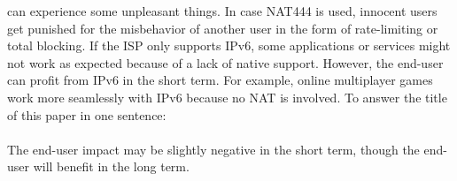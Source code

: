 \documentclass[format=sigconf, natbib=true, nonacm=true]{acmart}
\begin{document}
can experience some unpleasant things. In case NAT444 is used, innocent users get punished for the misbehavior of another user in the form of rate-limiting or total blocking. If the ISP only supports IPv6, some applications or services might not work as expected because of a lack of native support. However, the end-user can profit from IPv6 in the short term. For example, online multiplayer games work more seamlessly with IPv6 because no NAT is involved. To answer the title of this paper in one sentence:\\\\The end-user impact may be slightly negative in the short term, though the end-user will benefit in the long term.

    
    
\end{document}
